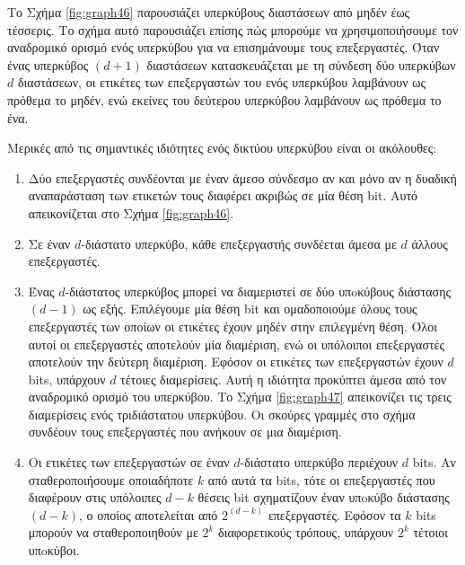 \documentclass[12pt,a4paper]{article}
\begin{document}
Το Σχήμα \ref{fig:graph46} παρουσιάζει υπερκύβους διαστάσεων από μηδέν έως 
τέσσερις. Το σχήμα αυτό παρουσιάζει επίσης πώς μπορούμε να χρησιμοποιήσουμε 
τον αναδρομικό ορισμό ενός υπερκύβου για να επισημάνουμε τους επεξεργαστές. 
Όταν ένας υπερκύβος $(d + 1)$ διαστάσεων κατασκευάζεται με τη σύνδεση δύο 
υπερκύβων $d$ διαστάσεων, οι ετικέτες των επεξεργαστών του ενός υπερκύβου 
λαμβάνουν ως πρόθεμα το μηδέν, ενώ εκείνες του δεύτερου υπερκύβου λαμβάνουν 
ως πρόθεμα το ένα.

Μερικές από τις σημαντικές ιδιότητες ενός δικτύου υπερκύβου είναι οι 
ακόλουθες:

\begin{enumerate}
    \item Δύο επεξεργαστές συνδέονται με έναν άμεσο σύνδεσμο αν και μόνο 
    αν η δυαδική αναπαράσταση των ετικετών τους διαφέρει ακριβώς σε μία 
    θέση \foreignlanguage{english}{bit}. Αυτό απεικονίζεται στο Σχήμα \ref{fig:graph46}.

    \item Σε έναν $d$-διάστατο υπερκύβο, κάθε επεξεργαστής συνδέεται άμεσα 
    με $d$ άλλους επεξεργαστές.

    \item Ένας $d$-διάστατος υπερκύβος μπορεί να διαμεριστεί σε δύο 
    υπoκύβους διάστασης $(d-1)$ ως εξής. Επιλέγουμε μία θέση 
    \foreignlanguage{english}{bit} και ομαδοποιούμε όλους τους επεξεργαστές 
    των οποίων οι ετικέτες έχουν μηδέν στην επιλεγμένη θέση. Όλοι αυτοί 
    οι επεξεργαστές αποτελούν μία διαμέριση, ενώ οι υπόλοιποι επεξεργαστές 
    αποτελούν την δεύτερη διαμέριση. Εφόσον οι ετικέτες των επεξεργαστών 
    έχουν $d$ \foreignlanguage{english}{bits}, υπάρχουν $d$ τέτοιες διαμερίσεις. 
    Αυτή η ιδιότητα προκύπτει άμεσα από τον αναδρομικό ορισμό του υπερκύβου. 
    Το Σχήμα \ref{fig:graph47} απεικονίζει τις τρεις διαμερίσεις ενός 
    τριδιάστατου υπερκύβου. Οι σκούρες γραμμές στο σχήμα συνδέουν 
    τους επεξεργαστές που ανήκουν σε μια διαμέριση.

    \item Οι ετικέτες των επεξεργαστών σε έναν $d$-διάστατο υπερκύβο περιέχουν 
    $d$ \foreignlanguage{english}{bits}. Αν σταθεροποιήσουμε οποιαδήποτε 
    $k$ από αυτά τα \foreignlanguage{english}{bits}, τότε οι επεξεργαστές 
    που διαφέρουν στις υπόλοιπες $d-k$ θέσεις \foreignlanguage{english}{bit} 
    σχηματίζουν έναν υπoκύβο διάστασης $(d-k)$, ο οποίος αποτελείται από 
    $2^{(d-k)}$ επεξεργαστές. Εφόσον τα $k$ \foreignlanguage{english}{bits} 
    μπορούν να σταθεροποιηθούν με $2^k$ διαφορετικούς τρόπους, υπάρχουν 
    $2^k$ τέτοιοι υπoκύβοι.


\end{enumerate}
\end{document}
